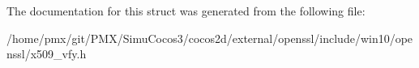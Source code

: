 The documentation for this struct was generated from the following file\+:\begin{DoxyCompactItemize}
\item 
/home/pmx/git/\+P\+M\+X/\+Simu\+Cocos3/cocos2d/external/openssl/include/win10/openssl/x509\+\_\+vfy.\+h\end{DoxyCompactItemize}
